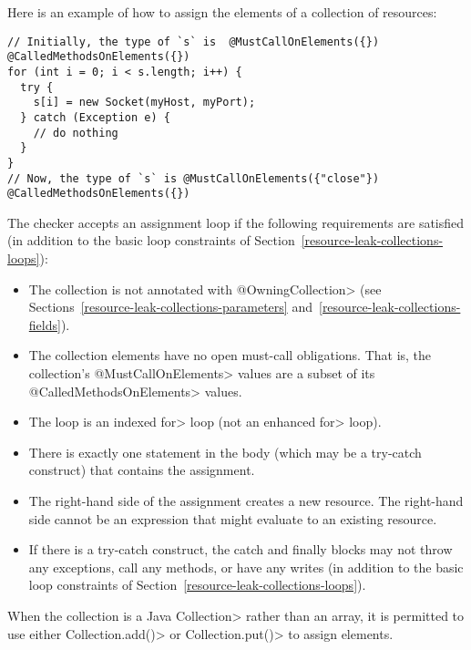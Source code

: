 
Here is an example of how to assign the elements of a collection of resources:

\begin{Verbatim}
// Initially, the type of `s` is  @MustCallOnElements({}) @CalledMethodsOnElements({})
for (int i = 0; i < s.length; i++) {
  try {
    s[i] = new Socket(myHost, myPort);
  } catch (Exception e) {
    // do nothing
  }
}
// Now, the type of `s` is @MustCallOnElements({"close"}) @CalledMethodsOnElements({})
\end{Verbatim}

The checker accepts an assignment loop if the following requirements are
satisfied (in addition to the basic loop constraints of Section~\ref{resource-leak-collections-loops}):

\begin{itemize}
  \item The collection is not annotated with \<@OwningCollection> (see
    Sections~\ref{resource-leak-collections-parameters} and~\ref{resource-leak-collections-fields}).
  \item The collection elements have no open must-call obligations.  That
    is, the collection's \<@MustCallOnElements> values are a subset of its
  \<@CalledMethodsOnElements> values.
  \item The loop is an indexed \<for> loop (not an enhanced \<for> loop).
  \item There is exactly one statement in the body (which may be a try-catch construct) that contains the assignment.
  \item The right-hand side of the assignment creates a new resource.
    The right-hand side cannot be an expression that might evaluate to an existing resource.
  \item If there is a try-catch construct, the catch and finally blocks may
    not throw any exceptions, call any methods, or have any writes (in
    addition to the basic loop constraints of Section~\ref{resource-leak-collections-loops}).
\end{itemize}

When the collection is a Java \<Collection> rather than an array, it is
permitted to use either \<Collection.add()> or \<Collection.put()> to assign
elements.



